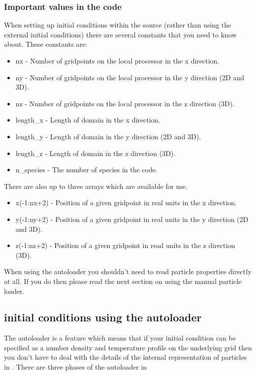 \documentclass[12pt,a4paper]{article}
\newcommand{\EPOCH}{{\color{warwickdark}\fontfamily{phv}\selectfont{EPOCH}}}
\begin{document}
\subsubsection{Important values in the {\EPOCH} code}
When setting up initial conditions within the {\EPOCH} source (rather than using
the external initial conditions) there are several constants that you need to
know about. These constants are:
\begin{itemize}
\item nx - Number of gridpoints on the local processor in the x direction.
\item ny - Number of gridpoints on the local processor in the y direction (2D
  and 3D).
\item nz - Number of gridpoints on the local processor in the z direction (3D).
\item length\_x - Length of domain in the x direction.
\item length\_y - Length of domain in the y direction (2D and 3D).
\item length\_z - Length of domain in the z direction (3D).
\item n\_species - The number of species in the code.
\end{itemize}

There are also up to three arrays which are available for use.
\begin{itemize}
\item x(-1:nx+2) - Position of a given gridpoint in real units in the x
  direction.
\item y(-1:ny+2) - Position of a given gridpoint in real units in the y
  direction (2D and 3D).
\item z(-1:nz+2) - Position of a given gridpoint in read units in the z
  direction (3D).
\end{itemize}

When using the autoloader you shouldn't need to read particle properties
directly at all. If you do then please read the next section on using the
manual particle loader.

\subsection{{\EPOCH} initial conditions using the autoloader}
The {\EPOCH} autoloader is a feature which means that if your initial condition
can be specified as a number density and temperature profile on the underlying
grid then you don't have to deal with the details of the internal
representation of particles in {\EPOCH}. There are three phases of the
autoloader in {\EPOCH}
\end{document}
